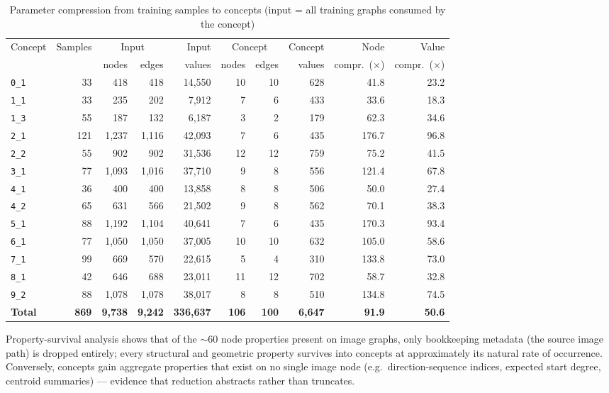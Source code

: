 \documentclass[conference]{IEEEtran}
\newcommand{\cid}[1]{\texttt{#1}}   %
\begin{document}
\begin{table}[!t]
\caption{Parameter compression from training samples to concepts
(input = all training graphs consumed by the concept)}
\label{tab:compression}
\centering
\begin{tabular}{lrrrrrrrrr}
\toprule
Concept & Samples & \multicolumn{2}{c}{Input} & Input & \multicolumn{2}{c}{Concept} & Concept & Node & Value \\
\cmidrule(lr){3-4}\cmidrule(lr){6-7}
 & & nodes & edges & values & nodes & edges & values & compr.\ ($\times$) & compr.\ ($\times$) \\
\midrule
\cid{0\_1} & 33 & 418 & 418 & 14{,}550 & 10 & 10 & 628 & 41.8 & 23.2 \\
\cid{1\_1} & 33 & 235 & 202 & 7{,}912 & 7 & 6 & 433 & 33.6 & 18.3 \\
\cid{1\_3} & 55 & 187 & 132 & 6{,}187 & 3 & 2 & 179 & 62.3 & 34.6 \\
\cid{2\_1} & 121 & 1{,}237 & 1{,}116 & 42{,}093 & 7 & 6 & 435 & 176.7 & 96.8 \\
\cid{2\_2} & 55 & 902 & 902 & 31{,}536 & 12 & 12 & 759 & 75.2 & 41.5 \\
\cid{3\_1} & 77 & 1{,}093 & 1{,}016 & 37{,}710 & 9 & 8 & 556 & 121.4 & 67.8 \\
\cid{4\_1} & 36 & 400 & 400 & 13{,}858 & 8 & 8 & 506 & 50.0 & 27.4 \\
\cid{4\_2} & 65 & 631 & 566 & 21{,}502 & 9 & 8 & 562 & 70.1 & 38.3 \\
\cid{5\_1} & 88 & 1{,}192 & 1{,}104 & 40{,}641 & 7 & 6 & 435 & 170.3 & 93.4 \\
\cid{6\_1} & 77 & 1{,}050 & 1{,}050 & 37{,}005 & 10 & 10 & 632 & 105.0 & 58.6 \\
\cid{7\_1} & 99 & 669 & 570 & 22{,}615 & 5 & 4 & 310 & 133.8 & 73.0 \\
\cid{8\_1} & 42 & 646 & 688 & 23{,}011 & 11 & 12 & 702 & 58.7 & 32.8 \\
\cid{9\_2} & 88 & 1{,}078 & 1{,}078 & 38{,}017 & 8 & 8 & 510 & 134.8 & 74.5 \\
\midrule
\textbf{Total} & \textbf{869} & \textbf{9{,}738} & \textbf{9{,}242} & \textbf{336{,}637} & \textbf{106} & \textbf{100} & \textbf{6{,}647} & \textbf{91.9} & \textbf{50.6} \\
\bottomrule
\end{tabular}
\end{table}

Property-survival analysis shows that of the $\sim$60 node properties
present on image graphs, only bookkeeping metadata (the source image path)
is dropped entirely; every structural and geometric property survives into
concepts at approximately its natural rate of occurrence. Conversely,
concepts gain aggregate properties that exist on no single image
node (e.g.\ direction-sequence indices, expected start degree, centroid
summaries) --- evidence that reduction abstracts rather than
truncates.
\end{document}
